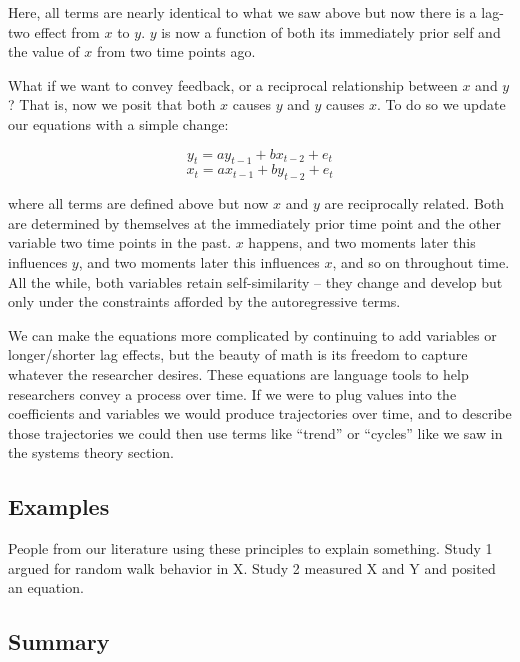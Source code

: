 \documentclass[english,,man]{apa6}
\theoremstyle{definition}
\theoremstyle{definition}
\theoremstyle{definition}
\theoremstyle{remark}
\begin{document}
\noindent Here, all terms are nearly identical to what we saw above but
now there is a lag-two effect from \(x\) to \(y\). \(y\) is now a
function of both its immediately prior self and the value of \(x\) from
two time points ago.

What if we want to convey feedback, or a reciprocal relationship between
\(x\) and \(y\)? That is, now we posit that both \(x\) causes \(y\) and
\(y\) causes \(x\). To do so we update our equations with a simple
change:

\begin{equation}
\label{sysy3}
y_{t} = a y_{t - 1} + b x_{t - 2} + e_{t}
\end{equation} \begin{equation}
\label{sysx3}
x_{t} = a x_{t - 1} + b y_{t - 2} + e_{t}
\end{equation}

\noindent where all terms are defined above but now \(x\) and \(y\) are
reciprocally related. Both are determined by themselves at the
immediately prior time point and the other variable two time points in
the past. \(x\) happens, and two moments later this influences \(y\),
and two moments later this influences \(x\), and so on throughout time.
All the while, both variables retain self-similarity -- they change and
develop but only under the constraints afforded by the autoregressive
terms.

We can make the equations more complicated by continuing to add
variables or longer/shorter lag effects, but the beauty of math is its
freedom to capture whatever the researcher desires. These equations are
language tools to help researchers convey a process over time. If we
were to plug values into the coefficients and variables we would produce
trajectories over time, and to describe those trajectories we could then
use terms like \enquote{trend} or \enquote{cycles} like we saw in the
systems theory section.

\hypertarget{examples}{%
\subsection{Examples}\label{examples}}

People from our literature using these principles to explain something.
Study 1 argued for random walk behavior in X. Study 2 measured X and Y
and posited an equation.

\hypertarget{summary-1}{%
\subsection{Summary}\label{summary-1}}
\end{document}
